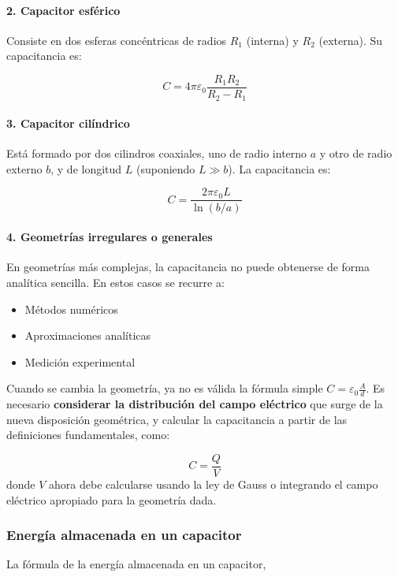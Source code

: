 \paragraph{2. Capacitor esférico}

Consiste en dos esferas concéntricas de radios \( R_1 \) (interna) y \( R_2 \) (externa). Su capacitancia es:

\[
C = 4\pi \varepsilon_0 \frac{R_1 R_2}{R_2 - R_1}
\]

\paragraph{3. Capacitor cilíndrico}

Está formado por dos cilindros coaxiales, uno de radio interno \( a \) y otro de radio externo \( b \), y de longitud \( L \) (suponiendo \( L \gg b \)). La capacitancia es:

\[
C = \frac{2\pi \varepsilon_0 L}{\ln(b/a)}
\]

\paragraph{4. Geometrías irregulares o generales}

En geometrías más complejas, la capacitancia no puede obtenerse de forma analítica sencilla. En estos casos se recurre a:

\begin{itemize}
    \item Métodos numéricos
    \item Aproximaciones analíticas
    \item Medición experimental
\end{itemize}

Cuando se cambia la geometría, ya no es válida la fórmula simple \( C = \varepsilon_0 \frac{A}{d} \). Es necesario \textbf{considerar la distribución del campo eléctrico} que surge de la nueva disposición geométrica, y calcular la capacitancia a partir de las definiciones fundamentales, como:

\[
C = \frac{Q}{V}
\]
donde \( V \) ahora debe calcularse usando la ley de Gauss o integrando el campo eléctrico apropiado para la geometría dada.

\subsubsection{Energía almacenada en un capacitor}

La fórmula de la energía almacenada en un capacitor,

